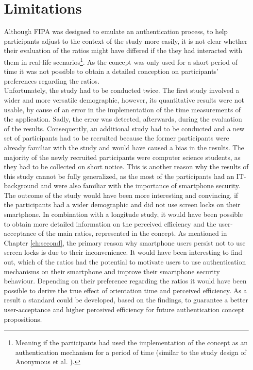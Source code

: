 \section{Limitations}

Although FIPA was designed to emulate an authentication process, to help participants adjust to the context of the study more easily, it is not clear whether their evaluation of the ratios might have differed if the they had interacted with them in real-life scenarios\footnote{Meaning if the participants had used the implementation of the concept as an authentication mechanism for a period of time (similar to the study design of Anonymous et al. \cite{anonymous}).}. As the concept was only used for a short period of time it was not possible to obtain a detailed conception on participants' preferences regarding the ratios.\\
Unfortunately, the study had to be conducted twice. The first study involved a wider and more versatile demographic, however, its quantitative results were not usable, by cause of an error in the implementation of the time measurements of the application. Sadly, the error was detected, afterwards, during the evaluation of the results. Consequently, an additional study had to be conducted and a new set of participants had to be recruited because the former participants were already familiar with the study and would have caused a bias in the results. The majority of the newly recruited participants were computer science students, as they had to be collected on short notice. This is another reason why the results of this study cannot be fully generalized, as the most of the participants had an IT-background and were also familiar with the importance of smartphone security. The outcome of the study would have been more interesting and convincing, if the participants had a wider demographic and did not use screen locks on their smartphone. In combination with a longitude study, it would have been possible to obtain more detailed information on the perceived efficiency and the user-acceptance of the main ratios, represented in the concept. As mentioned in Chapter \ref{ch:second}, the primary reason why smartphone users persist not to use screen locks is due to their inconvenience. It would have been interesting to find out, which of the ratios had the potential to motivate users to use authentication mechanisms on their smartphone and improve their smartphone security behaviour. Depending on their preference regarding the ratios it would have been possible to derive the true effect of orientation time and perceived efficiency. As a result a standard could be developed, based on the findings, to guarantee a better user-acceptance and higher perceived efficiency for future authentication concept propositions.

